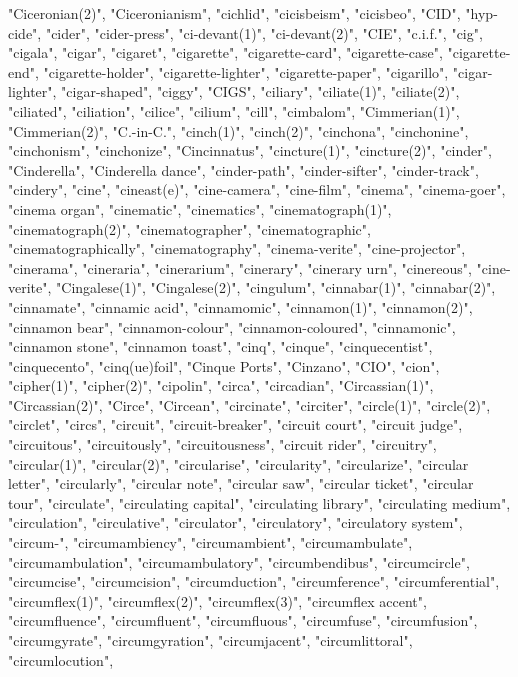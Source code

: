 "Ciceronian(2)",
"Ciceronianism",
"cichlid",
"cicisbeism",
"cicisbeo",
"CID",
"hyp-cide",
"cider",
"cider-press",
"ci-devant(1)",
"ci-devant(2)",
"CIE",
"c.i.f.",
"cig",
"cigala",
"cigar",
"cigaret",
"cigarette",
"cigarette-card",
"cigarette-case",
"cigarette-end",
"cigarette-holder",
"cigarette-lighter",
"cigarette-paper",
"cigarillo",
"cigar-lighter",
"cigar-shaped",
"ciggy",
"CIGS",
"ciliary",
"ciliate(1)",
"ciliate(2)",
"ciliated",
"ciliation",
"cilice",
"cilium",
"cill",
"cimbalom",
"Cimmerian(1)",
"Cimmerian(2)",
"C.-in-C.",
"cinch(1)",
"cinch(2)",
"cinchona",
"cinchonine",
"cinchonism",
"cinchonize",
"Cincinnatus",
"cincture(1)",
"cincture(2)",
"cinder",
"Cinderella",
"Cinderella dance",
"cinder-path",
"cinder-sifter",
"cinder-track",
"cindery",
"cine",
"cineast(e)",
"cine-camera",
"cine-film",
"cinema",
"cinema-goer",
"cinema organ",
"cinematic",
"cinematics",
"cinematograph(1)",
"cinematograph(2)",
"cinematographer",
"cinematographic",
"cinematographically",
"cinematography",
"cinema-verite",
"cine-projector",
"cinerama",
"cineraria",
"cinerarium",
"cinerary",
"cinerary urn",
"cinereous",
"cine-verite",
"Cingalese(1)",
"Cingalese(2)",
"cingulum",
"cinnabar(1)",
"cinnabar(2)",
"cinnamate",
"cinnamic acid",
"cinnamomic",
"cinnamon(1)",
"cinnamon(2)",
"cinnamon bear",
"cinnamon-colour",
"cinnamon-coloured",
"cinnamonic",
"cinnamon stone",
"cinnamon toast",
"cinq",
"cinque",
"cinquecentist",
"cinquecento",
"cinq(ue)foil",
"Cinque Ports",
"Cinzano",
"CIO",
"cion",
"cipher(1)",
"cipher(2)",
"cipolin",
"circa",
"circadian",
"Circassian(1)",
"Circassian(2)",
"Circe",
"Circean",
"circinate",
"circiter",
"circle(1)",
"circle(2)",
"circlet",
"circs",
"circuit",
"circuit-breaker",
"circuit court",
"circuit judge",
"circuitous",
"circuitously",
"circuitousness",
"circuit rider",
"circuitry",
"circular(1)",
"circular(2)",
"circularise",
"circularity",
"circularize",
"circular letter",
"circularly",
"circular note",
"circular saw",
"circular ticket",
"circular tour",
"circulate",
"circulating capital",
"circulating library",
"circulating medium",
"circulation",
"circulative",
"circulator",
"circulatory",
"circulatory system",
"circum-",
"circumambiency",
"circumambient",
"circumambulate",
"circumambulation",
"circumambulatory",
"circumbendibus",
"circumcircle",
"circumcise",
"circumcision",
"circumduction",
"circumference",
"circumferential",
"circumflex(1)",
"circumflex(2)",
"circumflex(3)",
"circumflex accent",
"circumfluence",
"circumfluent",
"circumfluous",
"circumfuse",
"circumfusion",
"circumgyrate",
"circumgyration",
"circumjacent",
"circumlittoral",
"circumlocution",
